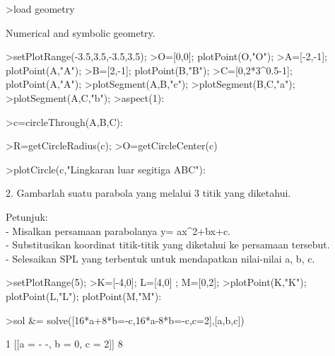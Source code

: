 \documentclass{article}
\begin{document}
\begin{eulernotebook}
\begin{eulercomment}
\begin{eulercomment}
\begin{eulercomment}
\begin{eulercomment}
\begin{eulercomment}
\begin{eulercomment}
\begin{eulercomment}
\begin{eulercomment}
\begin{eulercomment}
\end{eulercomment}
\begin{eulerprompt}
>load geometry
\end{eulerprompt}
\begin{euleroutput}
  Numerical and symbolic geometry.
\end{euleroutput}
\begin{eulerprompt}
>setPlotRange(-3.5,3.5,-3.5,3.5);
>O=[0,0]; plotPoint(O,"O");
>A=[-2,-1]; plotPoint(A,"A");
>B=[2,-1]; plotPoint(B,"B");
>C=[0,2*3^0.5-1]; plotPoint(A,"A");
>plotSegment(A,B,"c");
>plotSegment(B,C,"a");
>plotSegment(A,C,"b");
>aspect(1):
\end{eulerprompt}
\begin{eulerprompt}
>c=circleThrough(A,B,C):
\end{eulerprompt}
\begin{eulerprompt}
>R=getCircleRadius(c);
>O=getCircleCenter(c)
\end{eulerprompt}
\begin{euleroutput}
  [0,  0.154701]
\end{euleroutput}
\begin{eulerprompt}
>plotCircle(c,"Lingkaran luar segitiga ABC"):
\end{eulerprompt}
\begin{eulercomment}
2. Gambarlah suatu parabola yang melalui 3 titik yang diketahui.

Petunjuk:\\
- Misalkan persamaan parabolanya y= ax\textasciicircum{}2+bx+c.\\
- Substitusikan koordinat titik-titik yang diketahui ke persamaan
tersebut.\\
- Selesaikan SPL yang terbentuk untuk mendapatkan nilai-nilai a, b, c.
\end{eulercomment}
\begin{eulerprompt}
>setPlotRange(5); 
>K=[-4,0];  L=[4,0] ; M=[0,2];
>plotPoint(K,"K"); plotPoint(L,"L"); plotPoint(M,"M"): 
\end{eulerprompt}
\begin{eulerprompt}
>sol &= solve([16*a+8*b=-c,16*a-8*b=-c,c=2],[a,b,c])
\end{eulerprompt}
\begin{euleroutput}
  
                                1
                        [[a = - -, b = 0, c = 2]]
                                8
  

\end{euleroutput}
\end{eulercomment}
\end{eulercomment}
\end{eulercomment}
\end{eulercomment}
\end{eulercomment}
\end{eulercomment}
\end{eulercomment}
\end{eulercomment}
\end{eulernotebook}
\end{document}
